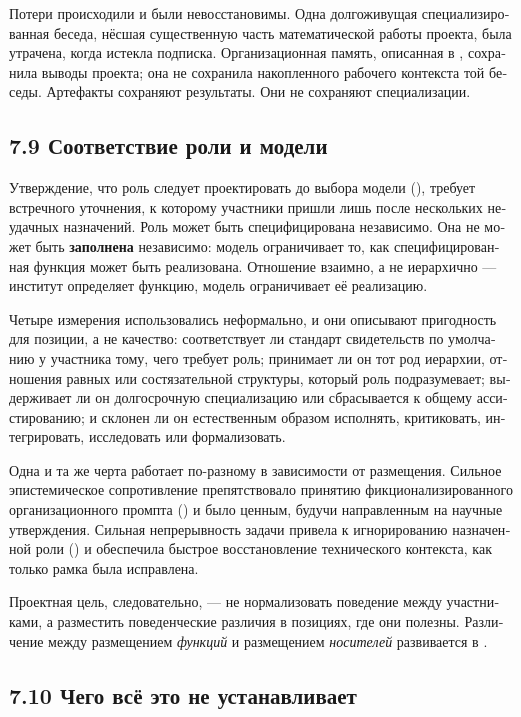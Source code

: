 \begin{russian}
Потери происходили и были невосстановимы. Одна долгоживущая специализированная беседа, нёсшая существенную часть математической работы проекта, была утрачена, когда истекла подписка. Организационная память, описанная в , сохранила выводы проекта; она не сохранила накопленного рабочего контекста той беседы. Артефакты сохраняют результаты. Они не сохраняют специализации.


\subsection*{7.9 Соответствие роли и модели}
\label{sec:ru:7.9}

Утверждение, что роль следует проектировать до выбора модели (), требует встречного уточнения, к которому участники пришли лишь после нескольких неудачных назначений. Роль может быть специфицирована независимо. Она не может быть \textbf{заполнена} независимо: модель ограничивает то, как специфицированная функция может быть реализована. Отношение взаимно, а не иерархично — институт определяет функцию, модель ограничивает её реализацию.

Четыре измерения использовались неформально, и они описывают пригодность для позиции, а не качество: соответствует ли стандарт свидетельств по умолчанию у участника тому, чего требует роль; принимает ли он тот род иерархии, отношения равных или состязательной структуры, который роль подразумевает; выдерживает ли он долгосрочную специализацию или сбрасывается к общему ассистированию; и склонен ли он естественным образом исполнять, критиковать, интегрировать, исследовать или формализовать.

Одна и та же черта работает по-разному в зависимости от размещения. Сильное эпистемическое сопротивление препятствовало принятию фикционализированного организационного промпта () и было ценным, будучи направленным на научные утверждения. Сильная непрерывность задачи привела к игнорированию назначенной роли () и обеспечила быстрое восстановление технического контекста, как только рамка была исправлена.

Проектная цель, следовательно, — не нормализовать поведение между участниками, а разместить поведенческие различия в позициях, где они полезны. Различение между размещением \emph{функций} и размещением \emph{носителей} развивается в .


\subsection*{7.10 Чего всё это не устанавливает}
\label{sec:ru:7.10}


\end{russian}
